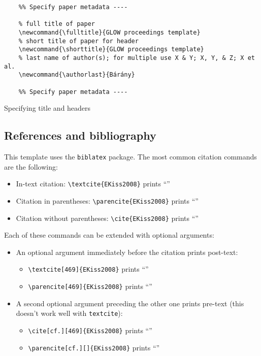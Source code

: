 \begin{listing}[H]
    \begin{verbatim}
    %% Specify paper metadata ----
    
    % full title of paper
    \newcommand{\fulltitle}{GLOW proceedings template}
    % short title of paper for header
    \newcommand{\shorttitle}{GLOW proceedings template}
    % last name of author(s); for multiple use X & Y; X, Y, & Z; X et al.
    \newcommand{\authorlast}{Bárány}
    
    %% Specify paper metadata ----
    \end{verbatim}
    \caption{Specifying title and headers}\label{lst:metadata}
\end{listing}

\subsection{References and bibliography}\label{sec:bibliography}

This template uses the \texttt{biblatex} package. The most common citation
commands are the following:

\begin{itemize}
    \item In-text citation: \verb+\textcite{EKiss2008}+ prints \enquote{\textcite{EKiss2008}}
    \item Citation in parentheses: \verb+\parencite{EKiss2008}+ prints \enquote{\parencite{EKiss2008}}
    \item Citation without parentheses: \verb+\cite{EKiss2008}+ prints \enquote{\cite{EKiss2008}}
\end{itemize}

Each of these commands can be extended with optional arguments:

\begin{itemize}
    \item An optional argument immediately before the citation prints post-text:
    \begin{itemize}
        \item \verb+\textcite[469]{EKiss2008}+ prints \enquote{\textcite[469]{EKiss2008}}
        \item \verb+\parencite[469]{EKiss2008}+ prints \enquote{\parencite[469]{EKiss2008}}
    \end{itemize}
    \item A second optional argument preceding the other one prints pre-text (this doesn't work well with \verb+textcite+):
    \begin{itemize}
        \item \verb+\cite[cf.][469]{EKiss2008}+ prints \enquote{\cite[cf.][469]{EKiss2008}}
        \item \verb+\parencite[cf.][]{EKiss2008}+ prints \enquote{\parencite[cf.][]{EKiss2008}}
    \end{itemize}
\end{itemize}

